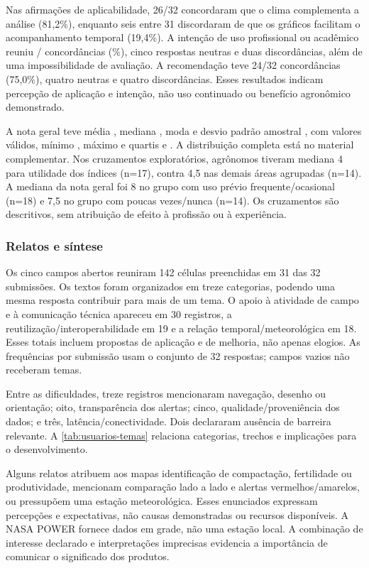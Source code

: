 

Nas afirmações de aplicabilidade, 26/32 concordaram que o clima complementa a análise (81,2\%), enquanto seis entre 31 discordaram de que os gráficos facilitam o acompanhamento temporal (19,4\%). A intenção de uso profissional ou acadêmico reuniu \UsIntencaoPos{}/\UsIntencaoN{} concordâncias (\UsIntencaoPct\%), cinco respostas neutras e duas discordâncias, além de uma impossibilidade de avaliação. A recomendação teve 24/32 concordâncias (75,0\%), quatro neutras e quatro discordâncias. Esses resultados indicam percepção de aplicação e intenção, não uso continuado ou benefício agronômico demonstrado.

A nota geral teve média \UsuariosMedia{}, mediana \UsuariosMediana{}, moda \UsuariosModa{} e desvio padrão amostral \UsuariosDP{}, com \UsuariosN{} valores válidos, mínimo \UsuariosMinimo{}, máximo \UsuariosMaximo{} e quartis \UsuariosQum{} e \UsuariosQtres{}. A distribuição completa está no material complementar. Nos cruzamentos exploratórios, agrônomos tiveram mediana 4 para utilidade dos índices (n=17), contra 4,5 nas demais áreas agrupadas (n=14). A mediana da nota geral foi 8 no grupo com uso prévio frequente/ocasional (n=18) e 7,5 no grupo com poucas vezes/nunca (n=14). Os cruzamentos são descritivos, sem atribuição de efeito à profissão ou à experiência.

\subsubsection{Relatos e síntese}

Os cinco campos abertos reuniram 142 células preenchidas em 31 das 32 submissões. Os textos foram organizados em treze categorias, podendo uma mesma resposta contribuir para mais de um tema. O apoio à atividade de campo e à comunicação técnica apareceu em 30 registros, a reutilização/interoperabilidade em 19 e a relação temporal/meteorológica em 18. Esses totais incluem propostas de aplicação e de melhoria, não apenas elogios. As frequências por submissão usam o conjunto de 32 respostas; campos vazios não receberam temas.

Entre as dificuldades, treze registros mencionaram navegação, desenho ou orientação; oito, transparência dos alertas; cinco, qualidade/proveniência dos dados; e três, latência/conectividade. Dois declararam ausência de barreira relevante. A \cref{tab:usuarios-temas} relaciona categorias, trechos e implicações para o desenvolvimento.



Alguns relatos atribuem aos mapas identificação de compactação, fertilidade ou produtividade, mencionam comparação lado a lado e alertas vermelhos/amarelos, ou pressupõem uma estação meteorológica. Esses enunciados expressam percepções e expectativas, não causas demonstradas ou recursos disponíveis. A NASA POWER fornece dados em grade, não uma estação local. A combinação de interesse declarado e interpretações imprecisas evidencia a importância de comunicar o significado dos produtos.
